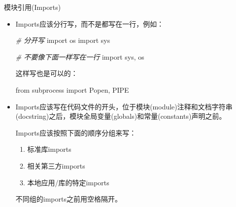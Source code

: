 \documentclass[ignorenonframetext,9pt]{beamer}
\newenvironment{Shaded}{}{}
\newcommand{\CommentTok}[1]{\textcolor[rgb]{0.38,0.63,0.69}{\textit{#1}}}
\newcommand{\ImportTok}[1]{#1}
\newcommand{\NormalTok}[1]{#1}
\providecommand{\tightlist}{%
  \setlength{\itemsep}{0pt}\setlength{\parskip}{0pt}}
\begin{document}
\begin{frame}[fragile]{模块引用(Imports)}

\begin{block}

\begin{itemize}
\item
  Imports应该分行写，而不是都写在一行，例如：

\begin{Shaded}
\begin{Highlighting}[]
\CommentTok{# 分开写}
\ImportTok{import}\NormalTok{ os}
\ImportTok{import}\NormalTok{ sys}

\CommentTok{# 不要像下面一样写在一行}
\ImportTok{import}\NormalTok{ sys, os}
\end{Highlighting}
\end{Shaded}

  这样写也是可以的：

\begin{Shaded}
\begin{Highlighting}[]
\ImportTok{from}\NormalTok{ subprocess }\ImportTok{import}\NormalTok{ Popen, PIPE}
\end{Highlighting}
\end{Shaded}
\end{itemize}

\end{block}

\end{frame}

\begin{frame}

\begin{itemize}
\item
  Imports应该写在代码文件的开头，位于模块(module)注释和文档字符串(docstring)之后，模块全局变量(globals)和常量(constants)声明之前。

  Imports应该按照下面的顺序分组来写：

  \begin{enumerate}
  \tightlist
  \item
    标准库imports
  \item
    相关第三方imports
  \item
    本地应用/库的特定imports
  \end{enumerate}

  不同组的imports之前用空格隔开。
\end{itemize}

\end{frame}
\end{document}
